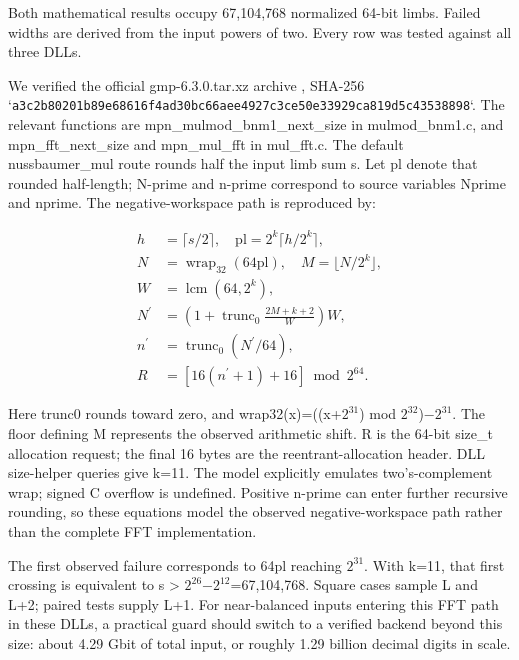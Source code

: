\documentclass[11pt,a4paper]{article}
\begin{document}
Both mathematical results occupy 67,104,768 normalized 64-bit limbs. Failed widths are derived from the input powers of two. Every row was tested against all three DLLs.

We verified the official gmp-6.3.0.tar.xz archive \cite{gmp_source}, SHA-256 `\texttt{a3c2b80201b89e68\allowbreak{}616f4ad30bc66aee\allowbreak{}4927c3ce50e33929\allowbreak{}ca819d5c43538898}`. The relevant functions are mpn\_\allowbreak{}mulmod\_\allowbreak{}bnm1\_\allowbreak{}next\_\allowbreak{}size in mulmod\_\allowbreak{}bnm1.c, and mpn\_\allowbreak{}fft\_\allowbreak{}next\_\allowbreak{}size and mpn\_\allowbreak{}mul\_\allowbreak{}fft in mul\_\allowbreak{}fft.c. The default nussbaumer\_\allowbreak{}mul route rounds half the input limb sum s. Let pl denote that rounded half-length; N-prime and n-prime correspond to source variables Nprime and nprime. The negative-workspace path is reproduced by:

\begin{equation}
\begin{aligned}h&=\lceil s/2\rceil,\quad \mathrm{pl}=2^k\lceil h/2^k\rceil,\\N&=\operatorname{wrap}_{32}(64\mathrm{pl}),\quad M=\lfloor N/2^k\rfloor,\\W&=\operatorname{lcm}(64,2^k),\\N^{\prime}&=\left(1+\operatorname{trunc}_0\frac{2M+k+2}{W}\right)W,\\n^{\prime}&=\operatorname{trunc}_0(N^{\prime}/64),\\R&=\left[16(n^{\prime}+1)+16\right]\bmod 2^{64}.\end{aligned}
\end{equation}

Here trunc0 rounds toward zero, and wrap32(x)=((x+$2^{31}$) mod $2^{32}$)\ensuremath{-}$2^{31}$. The floor defining M represents the observed arithmetic shift. R is the 64-bit size\_\allowbreak{}t allocation request; the final 16 bytes are the reentrant-allocation header. DLL size-helper queries give k=11. The model explicitly emulates two's-complement wrap; signed C overflow is undefined. Positive n-prime can enter further recursive rounding, so these equations model the observed negative-workspace path rather than the complete FFT implementation.

The first observed failure corresponds to 64pl reaching $2^{31}$. With k=11, that first crossing is equivalent to s > $2^{26}$\ensuremath{-}$2^{12}$=67,104,768. Square cases sample L and L+2; paired tests supply L+1. For near-balanced inputs entering this FFT path in these DLLs, a practical guard should switch to a verified backend beyond this size: about 4.29 Gbit of total input, or roughly 1.29 billion decimal digits in scale.
\end{document}
